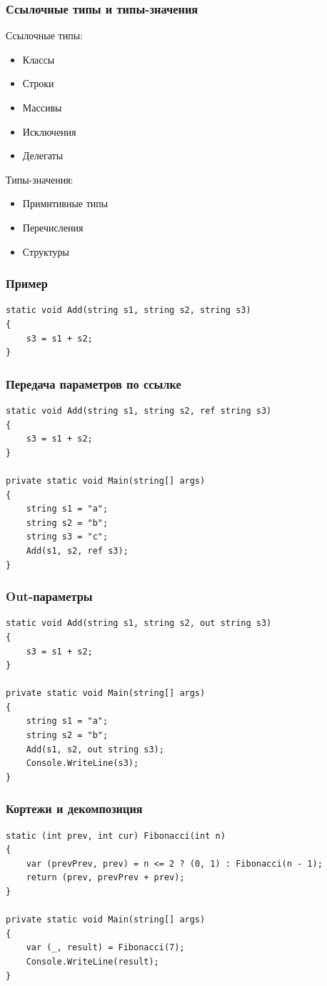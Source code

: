 \documentclass[xetex,mathserif,serif]{beamer}
\begin{document}
	\begin{frame}
		\frametitle{Ссылочные типы и типы-значения}
		Ссылочные типы:
		\begin{itemize}
			\item Классы
			\item Строки
			\item Массивы
			\item Исключения
			\item Делегаты
		\end{itemize}
		Типы-значения:
		\begin{itemize}
			\item Примитивные типы
			\item Перечисления
			\item Структуры
		\end{itemize}
	\end{frame}

	\begin{frame}[fragile]
		\frametitle{Пример}
		\begin{verbatim}
static void Add(string s1, string s2, string s3)
{
    s3 = s1 + s2;
}
		\end{verbatim}
\end{frame}

	\begin{frame}[fragile]
		\frametitle{Передача параметров по ссылке}
		\begin{verbatim}
static void Add(string s1, string s2, ref string s3)
{
    s3 = s1 + s2;
}

private static void Main(string[] args)
{
    string s1 = "a";
    string s2 = "b";
    string s3 = "c";
    Add(s1, s2, ref s3);
}
		\end{verbatim}
\end{frame}

	\begin{frame}[fragile]
		\frametitle{Out-параметры}
		\begin{verbatim}
static void Add(string s1, string s2, out string s3)
{
    s3 = s1 + s2;
}

private static void Main(string[] args)
{
    string s1 = "a";
    string s2 = "b";
    Add(s1, s2, out string s3);
    Console.WriteLine(s3);
}
		\end{verbatim}
\end{frame}

	\begin{frame}[fragile]
		\frametitle{Кортежи и декомпозиция}
		\begin{verbatim}
static (int prev, int cur) Fibonacci(int n)
{
    var (prevPrev, prev) = n <= 2 ? (0, 1) : Fibonacci(n - 1);
    return (prev, prevPrev + prev);
}

private static void Main(string[] args)
{
    var (_, result) = Fibonacci(7);
    Console.WriteLine(result);
}
		\end{verbatim}
\end{frame}
\end{document}
